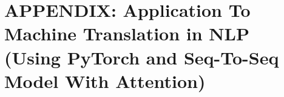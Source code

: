 \section{APPENDIX: Application To Machine Translation in NLP (Using PyTorch and Seq-To-Seq Model With Attention)} \label{Appendix_Seq2Seq}

